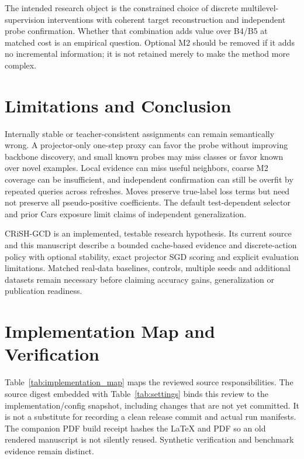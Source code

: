 \documentclass[conference]{IEEEtran}
\begin{document}
The intended research object is the constrained choice of discrete multilevel-supervision interventions with coherent target reconstruction and independent probe confirmation. Whether that combination adds value over B4/B5 at matched cost is an empirical question. Optional M2 should be removed if it adds no incremental information; it is not retained merely to make the method more complex.

\section{Limitations and Conclusion}
Internally stable or teacher-consistent assignments can remain semantically wrong. A projector-only one-step proxy can favor the probe without improving backbone discovery, and small known probes may miss classes or favor known over novel examples. Local evidence can miss useful neighbors, coarse M2 coverage can be insufficient, and independent confirmation can still be overfit by repeated queries across refreshes. Moves preserve true-label loss terms but need not preserve all pseudo-positive coefficients. The default test-dependent selector and prior Cars exposure limit claims of independent generalization.

CRiSH-GCD is an implemented, testable research hypothesis. Its current source and this manuscript describe a bounded cache-based evidence and discrete-action policy with optional stability, exact projector SGD scoring and explicit evaluation limitations. Matched real-data baselines, controls, multiple seeds and additional datasets remain necessary before claiming accuracy gains, generalization or publication readiness.

\appendix
\section{Implementation Map and Verification}


Table~\ref{tab:implementation_map} maps the reviewed source responsibilities. The source digest embedded with Table~\ref{tab:settings} binds this review to the implementation/config snapshot, including changes that are not yet committed. It is not a substitute for recording a clean release commit and actual run manifests. The companion PDF build receipt hashes the LaTeX and PDF so an old rendered manuscript is not silently reused. Synthetic verification and benchmark evidence remain distinct.
\end{document}
